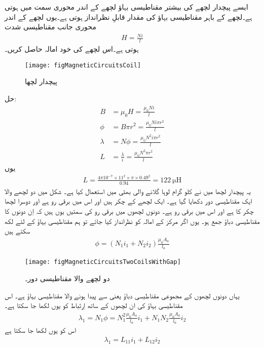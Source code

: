ایسے پیچدار لچھے کی بیشتر مقناطیسی بہاؤ لچھے کے اندر محوری سمت میں ہوتی ہے۔لچھے کے باہر مقناطیسی بہاؤ کی مقدار قابلِ نظرانداز ہوتی ہے۔یوں لچھے کے اندر محوری جانب مقناطیسی شدت
\begin{align*}
H=\frac{N i}{l}
\end{align*}
ہوتی ہے۔اس لچھے کی خود امالہ حاصل کریں۔
\begin{figure}
\centering
\texttt{[image: figMagneticCircuitsCoil]}
\caption{پیچدار لچھا}
\label{شکل_مقناطیسی_ادوار_پیچدار_لچھا}
\end{figure}
حل:
\begin{align*}
B&=\mu_0 H=\frac{\mu_0 N i}{l}\\
\phi&=B  \pi r^2=\frac{\mu_0 N i \pi r^2}{l}\\ 
\lambda&=N \phi =\frac{\mu_0 N^2 i \pi r^2}{l}\\ 
L&=\frac{\lambda}{i}=\frac{\mu_0 N^2 \pi r^2}{l}
\end{align*} 
یوں
\begin{align*}
L=\frac{4 \pi 10^{-7} \times 11^2 \times \pi  \times 0.49^2}{0.94}=\SI{122}{\micro \henry}
\end{align*}
یہ پیچدار لچھا میں نے   کلو گرام لوہا گلانے والی بھٹی میں استعمال کیا ہے۔
%
شکل  میں دو لچھے والا ایک مقناطیسی دور دکھایا گیا ہے۔ ایک لچھے کے   چکر ہیں اور اس میں برقی رو  ہے اور دوسرا لچھا  چکر کا ہے اور اس میں برقی  رو  ہے۔ دونوں لچھوں میں برقی رو کی سمتیں یوں ہیں کہ اِن  دونوں کا مقناطیسی دباؤ جمع ہو۔ یوں اگر مرکز کے امالہ کو نظرانداز کیا جائے تو ہم مقناطیسی بہاؤ  کے لئے لکھ سکتے ہیں
\begin{align}
\phi=\left (N_1 i_1 +N_2 i_2 \right ) \frac{\mu_0 A_a}{l_a}
\end{align} 
%
\begin{figure}
\centering
\texttt{[image: figMagneticCircuitsTwoCoilsWithGap]}
\caption{دو لچھے والا مقناطیسی دور۔}
\label{شکل_مقناطیسی_ادوار_دو_لچھے_ایک_درز}
\end{figure}
یہاں  دونوں لچھوں کے مجموعی مقناطیسی دباؤ یعنی  سے پیدا ہونے والا مقناطیسی بہاؤ ہے۔ اس مقناطیسی بہاؤ  کی ان  لچھوں  کے ساتھ  اِرتَباط کو یوں لکھا جا سکتا ہے۔
\begin{align}
\lambda_1=N_1 \phi=N_1^2  \frac{\mu_0 A_a}{l_a} i_1 +N_1 N_2  \frac{\mu_0 A_a}{l_a} i_2
\end{align}
اس کو یوں لکھا جا سکتا ہے
\begin{align}\label{مساوات_مقناطیسی_دور_ارتباط_دو_لچھے}
\lambda_1 = L_{11} i_1+L_{12} i_2
\end{align}
